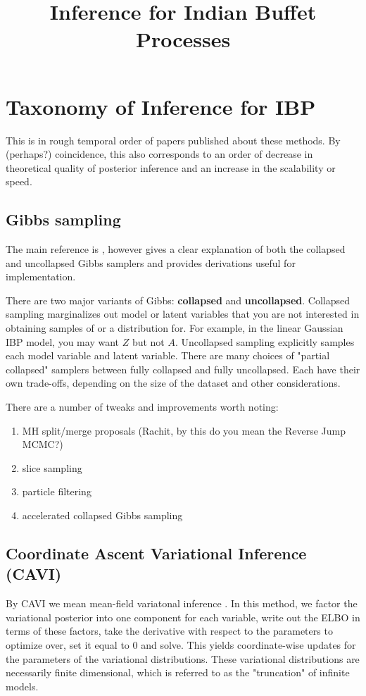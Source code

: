 \documentclass[a4paper, 11pt]{article}
\title{Inference for Indian Buffet Processes}
\author{}
\begin{document}
\maketitle
\tableofcontents

\section{Taxonomy of Inference for IBP}
This is in rough temporal order of papers published about these methods. By (perhaps?) coincidence, this also corresponds to an order of decrease in theoretical quality of posterior inference and an increase in the scalability or speed.

\subsection{Gibbs sampling}

The main reference is \citet{ghahramani2006infinite}, however \citet{doshi2009report} gives a clear explanation of both the collapsed and uncollapsed Gibbs samplers and provides derivations useful for implementation.

\medskip

There are two major variants of Gibbs: \textbf{collapsed} and \textbf{uncollapsed}. Collapsed sampling marginalizes out model or latent variables that you are not interested in obtaining samples of or a distribution for. For example, in the linear Gaussian IBP model, you may want $Z$ but not $A$. Uncollapsed sampling explicitly samples each model variable and latent variable. There are many choices of "partial collapsed" samplers between fully collapsed and fully uncollapsed. Each have their own trade-offs, depending on the size of the dataset and other considerations.

\medskip

There are a number of tweaks and improvements worth noting:
\begin{enumerate}
    \item MH split/merge proposals \citep{meeds2007modeling} (Rachit, by this do you mean the Reverse Jump MCMC?)
    \item slice sampling \citep{teh2007stick}
    \item particle filtering \citep{wood2007particle}
    \item accelerated collapsed Gibbs sampling  \citep{doshi2009accelerated}
\end{enumerate}

\subsection{Coordinate Ascent Variational Inference (CAVI)}
By CAVI we mean mean-field variatonal inference \citep{beal2003variational, wainwright2008graphical}. In this method, we factor the variational posterior into one component for each variable, write out the ELBO in terms of these factors, take the derivative with respect to the parameters to optimize over, set it equal to 0 and solve. This yields coordinate-wise updates for the parameters of the variational distributions. These variational distributions are necessarily finite dimensional, which is referred to as the "truncation" of infinite models.
\end{document}
